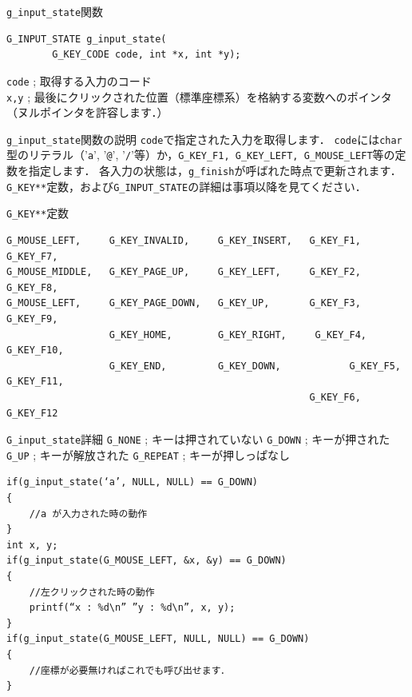 \documentclass[a4paper,12pt]{jsarticle}%
\begin{document}
\begin{itembox}[l]{\texttt{g\_input\_state}関数}
\begin{verbatim}
G_INPUT_STATE g_input_state(
        G_KEY_CODE code, int *x, int *y);
\end{verbatim}
\verb|code| ; 取得する入力のコード\\
\verb|x,y| ; 最後にクリックされた位置（標準座標系）を格納する変数へのポインタ（ヌルポインタを許容します．）\\
\end{itembox}

\begin{itembox}[l]{\texttt{g\_input\_state}関数の説明}
\verb|code|で指定された入力を取得します．
\verb|code|には\verb|char|型のリテラル（'\verb|a|', '\verb|@|', '\verb|/|'等）か，\verb|G_KEY_F1, G_KEY_LEFT, G_MOUSE_LEFT|等の定数を指定します．
各入力の状態は，\verb|g_finish|が呼ばれた時点で更新されます．
\verb|G_KEY**|定数，および\verb|G_INPUT_STATE|の詳細は事項以降を見てください．
\end{itembox}
\begin{itembox}[l]{\texttt{G\_KEY**}定数}
\begin{verbatim}
G_MOUSE_LEFT,     G_KEY_INVALID,     G_KEY_INSERT,   G_KEY_F1, 	G_KEY_F7,
G_MOUSE_MIDDLE,   G_KEY_PAGE_UP,     G_KEY_LEFT,     G_KEY_F2, 	G_KEY_F8,
G_MOUSE_LEFT,     G_KEY_PAGE_DOWN,   G_KEY_UP,       G_KEY_F3, 	G_KEY_F9,
                  G_KEY_HOME,        G_KEY_RIGHT, 	  G_KEY_F4, 	G_KEY_F10,
                  G_KEY_END,         G_KEY_DOWN,	    	G_KEY_F5, 	G_KEY_F11,
                                                     G_KEY_F6,	  G_KEY_F12
 \end{verbatim}
\end{itembox}
\begin{itembox}[l]{\texttt{G\_input\_state}詳細}
\verb|G_NONE| ; キーは押されていない
\verb|G_DOWN| ; キーが押された
\verb|G_UP| ; キーが解放された
\verb|G_REPEAT| ; キーが押しっぱなし
\begin{verbatim}
if(g_input_state(‘a’, NULL, NULL) == G_DOWN)
{
	//a が入力された時の動作
}
int x, y;
if(g_input_state(G_MOUSE_LEFT, &x, &y) == G_DOWN)
{
	//左クリックされた時の動作
	printf(“x : %d\n” ”y : %d\n”, x, y);
}
if(g_input_state(G_MOUSE_LEFT, NULL, NULL) == G_DOWN)
{
	//座標が必要無ければこれでも呼び出せます．
}
 \end{verbatim}
\end{itembox}
\end{document}
